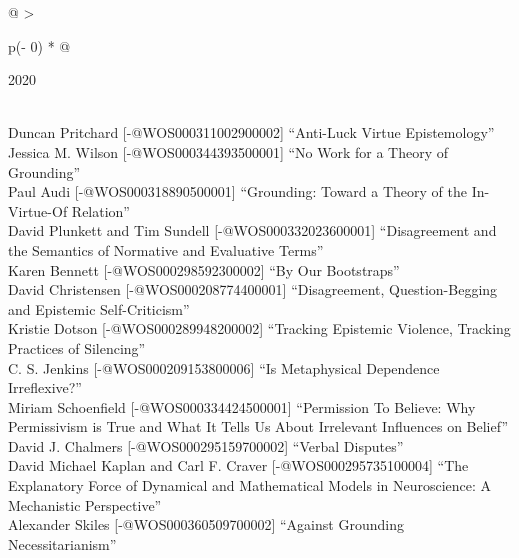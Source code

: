 \documentclass[
  10pt,
  letterpaper,
  DIV=11,
  numbers=noendperiod,
  twoside]{scrartcl}
\begin{document}
\begin{longtable}[]{@{}
  >{\raggedright\arraybackslash}p{(\columnwidth - 0\tabcolsep) * }@{}}

\caption{\label{tbl-top-ten-2011}Most cited articles published less than
ten years ago as of 2020.}

\tabularnewline

\toprule\noalign{}
\begin{minipage}[b]{\linewidth}\raggedright
2020
\end{minipage} \\
\midrule\noalign{}
\endhead
\bottomrule\noalign{}
\endlastfoot
Duncan Pritchard {[}-@WOS000311002900002{]} ``Anti-Luck Virtue
Epistemology'' \\
Jessica M. Wilson {[}-@WOS000344393500001{]} ``No Work for a Theory of
Grounding'' \\
Paul Audi {[}-@WOS000318890500001{]} ``Grounding: Toward a Theory of the
In-Virtue-Of Relation'' \\
David Plunkett and Tim Sundell {[}-@WOS000332023600001{]} ``Disagreement
and the Semantics of Normative and Evaluative Terms'' \\
Karen Bennett {[}-@WOS000298592300002{]} ``By Our Bootstraps'' \\
David Christensen {[}-@WOS000208774400001{]} ``Disagreement,
Question-Begging and Epistemic Self-Criticism'' \\
Kristie Dotson {[}-@WOS000289948200002{]} ``Tracking Epistemic Violence,
Tracking Practices of Silencing'' \\
C. S. Jenkins {[}-@WOS000209153800006{]} ``Is Metaphysical Dependence
Irreflexive?'' \\
Miriam Schoenfield {[}-@WOS000334424500001{]} ``Permission To Believe:
Why Permissivism is True and What It Tells Us About Irrelevant
Influences on Belief'' \\
David J. Chalmers {[}-@WOS000295159700002{]} ``Verbal Disputes'' \\
David Michael Kaplan and Carl F. Craver {[}-@WOS000295735100004{]} ``The
Explanatory Force of Dynamical and Mathematical Models in Neuroscience:
A Mechanistic Perspective'' \\
Alexander Skiles {[}-@WOS000360509700002{]} ``Against Grounding
Necessitarianism'' \\

\end{longtable}
\end{document}
